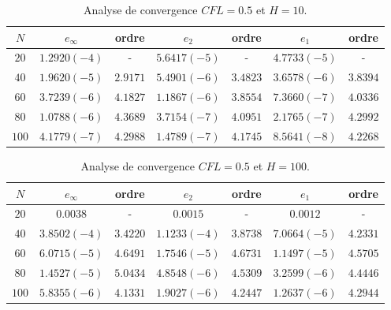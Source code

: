 \begin{table}[ht]
\begin{center}
\begin{tabular}{c|c|c|c|c|c|c}
$N$ & $e_{\infty}$ & ordre & $e_2$ & ordre & $e_1$ & ordre \\ 
\hline 
\hline
$20$ & $1.2920 (-4)$ & - & $5.6417 (-5)$ & - & $4.7733 (-5)$ & - \\ 
\hline 
$40$ & $1.9620 (-5)$ & $2.9171$ & $5.4901 (-6)$ & $3.4823$ & $3.6578 (-6)$ & $3.8394$ \\ 
\hline 
$60$ & $3.7239 (-6)$ & $4.1827$ & $1.1867 (-6)$ & $3.8554$ & $7.3660 (-7)$ & $4.0336$ \\
\hline 
$80$ & $1.0788 (-6)$ & $4.3689$ & $3.7154 (-7)$ & $4.0951$ & $2.1765 (-7)$ & $4.2992$ \\ 
\hline 
$100$ & $4.1779(-7)$ & $4.2988$ & $1.4789 (-7)$ & $4.1745$ & $8.5641 (-8)$ & $4.2268$  \\ 
\end{tabular} 
\caption{Analyse de convergence $CFL=0.5$ et $H=10$.}
\label{CV_order4_hp10}
\end{center}
\end{table}

\begin{table}[ht]
\begin{center}
\begin{tabular}{c|c|c|c|c|c|c}
$N$ & $e_{\infty}$ & ordre & $e_2$ & ordre & $e_1$ & ordre \\ 
\hline 
\hline
$20$ & $0.0038$ & - & $0.0015$ & - & $0.0012$ & - \\ 
\hline 
$40$ & $3.8502 (-4)$ & $3.4220$ & $1.1233 (-4)$ & $3.8738$ & $7.0664 (-5)$ & $4.2331$ \\ 
\hline 
$60$ & $6.0715 (-5)$ & $4.6491$ & $1.7546 (-5)$ & $4.6731$ & $1.1497 (-5)$ & $4.5705$ \\
\hline 
$80$ & $1.4527 (-5)$ & $5.0434$ & $4.8548 (-6)$ & $4.5309$ & $3.2599 (-6)$ & $4.4446$ \\ 
\hline 
$100$ & $5.8355(-6)$ & $4.1331$ & $1.9027 (-6)$ & $4.2447$ & $1.2637 (-6)$ & $4.2944$  \\ 
\end{tabular} 
\caption{Analyse de convergence $CFL=0.5$ et $H=100$.}
\label{CV_order4_hp100}
\end{center}
\end{table}

